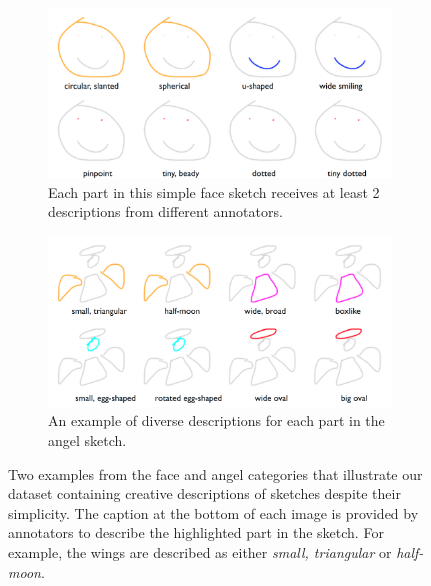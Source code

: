 \begin{figure}[!htb]
\begin{subfigure}{\textwidth}
\centering
\includegraphics[width=\linewidth]{data_collection/summary/smileyface_descriptions.png}  
\caption{Each part in this simple face sketch receives at least 2 descriptions from different annotators.}
\label{datasummary.face.varied_language}
\end{subfigure}
\newline
\begin{subfigure}{\textwidth}
\centering
\includegraphics[width=\linewidth]{data_collection/summary/angel_descriptions.png}  
\caption{An example of diverse descriptions for each part in the angel sketch.}
\label{datasummary.angel.varied_language}
\end{subfigure}
\caption{Two examples from the face and angel categories that illustrate our dataset containing creative descriptions of sketches despite their simplicity. The caption at the bottom of each image is provided by annotators to describe the highlighted part in the sketch. For example, the wings are described as either \textit{small, triangular} or \textit{half-moon}.}
\label{datasummary.face_angel.varied_language}
\end{figure}

